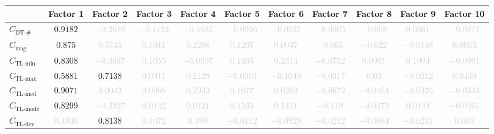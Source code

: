 \documentclass{standalone}
\newcommand{\magnitudename}{\text{mag}}
\newcommand{\magnitude}{C_{\magnitudename}}
\newcommand{\tlminname}{\text{TL-min}}
\newcommand{\tlmin}{C_{\tlminname}}
\newcommand{\tlmaxname}{\text{TL-max}}
\newcommand{\tlmax}{C_{\tlmaxname}}
\newcommand{\tlmedname}{\text{TL-med}}
\newcommand{\tlmed}{C_{\tlmedname}}
\newcommand{\tlmodename}{\text{TL-mode}}
\newcommand{\tlmode}{C_{\tlmodename}}
\newcommand{\tldevname}{\text{TL-dev}}
\newcommand{\tldev}{C_{\tldevname}}
\newcommand{\numberuniquetracesname}{\text{DT-\#}}
\newcommand{\numberuniquetraces}{C_{\numberuniquetracesname}}
\begin{document}
\begin{tabular}{lcccccccccc} \toprule 
 & \textbf{Factor 1} & \textbf{Factor 2} & \textbf{Factor 3} & \textbf{Factor 4} & \textbf{Factor 5} & \textbf{Factor 6} & \textbf{Factor 7} & \textbf{Factor 8} & \textbf{Factor 9} & \textbf{Factor 10} \\ \midrule 
$\numberuniquetraces$ & $0.9182$ & \textcolor{lightgray}{$-0.2619$} & \textcolor{lightgray}{$-0.1124$} & \textcolor{lightgray}{$-0.1687$} & \textcolor{lightgray}{$-0.0996$} & \textcolor{lightgray}{$-0.0527$} & \textcolor{lightgray}{$-0.0805$} & \textcolor{lightgray}{$-0.068$} & \textcolor{lightgray}{$0.0361$} & \textcolor{lightgray}{$-0.0577$} \\ 
$\magnitude$ & $0.875$ & \textcolor{lightgray}{$0.3745$} & \textcolor{lightgray}{$0.1011$} & \textcolor{lightgray}{$0.2288$} & \textcolor{lightgray}{$0.1207$} & \textcolor{lightgray}{$0.0037$} & \textcolor{lightgray}{$-0.065$} & \textcolor{lightgray}{$-0.022$} & \textcolor{lightgray}{$-0.0148$} & \textcolor{lightgray}{$0.0053$} \\ 
$\tlmin$ & $0.8308$ & \textcolor{lightgray}{$-0.3687$} & \textcolor{lightgray}{$0.1053$} & \textcolor{lightgray}{$-0.0697$} & \textcolor{lightgray}{$0.1465$} & \textcolor{lightgray}{$0.2314$} & \textcolor{lightgray}{$-0.0752$} & \textcolor{lightgray}{$0.0991$} & \textcolor{lightgray}{$0.1004$} & \textcolor{lightgray}{$-0.0981$} \\ 
$\tlmax$ & $0.5881$ & $0.7138$ & \textcolor{lightgray}{$0.0911$} & \textcolor{lightgray}{$0.2129$} & \textcolor{lightgray}{$-0.0361$} & \textcolor{lightgray}{$-0.1049$} & \textcolor{lightgray}{$-0.0317$} & \textcolor{lightgray}{$0.03$} & \textcolor{lightgray}{$-0.0212$} & \textcolor{lightgray}{$0.0439$} \\ 
$\tlmed$ & $0.9071$ & \textcolor{lightgray}{$0.0043$} & \textcolor{lightgray}{$0.0668$} & \textcolor{lightgray}{$0.2933$} & \textcolor{lightgray}{$0.1977$} & \textcolor{lightgray}{$0.0262$} & \textcolor{lightgray}{$-0.0672$} & \textcolor{lightgray}{$-0.0424$} & \textcolor{lightgray}{$-0.0375$} & \textcolor{lightgray}{$-0.0343$} \\ 
$\tlmode$ & $0.8299$ & \textcolor{lightgray}{$-0.3927$} & \textcolor{lightgray}{$0.0142$} & \textcolor{lightgray}{$0.0121$} & \textcolor{lightgray}{$0.1503$} & \textcolor{lightgray}{$0.1411$} & \textcolor{lightgray}{$-0.119$} & \textcolor{lightgray}{$-0.0473$} & \textcolor{lightgray}{$0.0144$} & \textcolor{lightgray}{$-0.0461$} \\ 
$\tldev$ & \textcolor{lightgray}{$0.4946$} & $0.8138$ & \textcolor{lightgray}{$0.1072$} & \textcolor{lightgray}{$0.199$} & \textcolor{lightgray}{$-0.0112$} & \textcolor{lightgray}{$-0.0929$} & \textcolor{lightgray}{$-0.0212$} & \textcolor{lightgray}{$-0.0084$} & \textcolor{lightgray}{$-0.0231$} & \textcolor{lightgray}{$0.063$} \\ 

\end{tabular}
\end{document}
